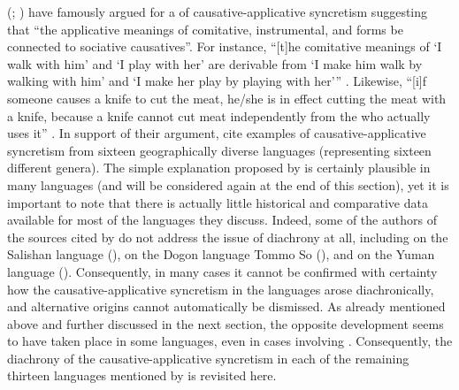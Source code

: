 \citeauthor{shibatani:pardeshi:2001} (\citeyear{shibatani:pardeshi:2001}; \citeyear[118]{shibatani:pardeshi:2002}) have famously argued for a  of causative-applicative syncretism suggesting that “the applicative meanings of comitative, instrumental, and  forms be connected to sociative causatives”. For instance, “[t]he comitative meanings of ‘I walk with him’ and ‘I play with her’ are derivable from ‘I make him walk by walking with him’ and ‘I make her play by playing with her’” \citep[118]{shibatani:pardeshi:2002}. Likewise, “[i]f someone causes a knife to cut the meat, he/she is in effect cutting the meat with a knife, because a knife cannot cut meat independently from the   who actually uses it” \citep[119]{shibatani:pardeshi:2002}. In support of their argument, \citeauthor{shibatani:pardeshi:2002} cite examples of causative-applicative syncretism from sixteen geographically diverse languages (representing sixteen different genera). The simple explanation proposed by \citeauthor{shibatani:pardeshi:2002} is certainly plausible in many languages (and will be considered again at the end of this section), yet it is important to note that there is actually little historical and comparative data available for most of the languages they discuss. Indeed, some of the authors of the sources cited by \citeauthor{shibatani:pardeshi:2002} do not address the issue of diachrony at all, including \cite{saunders:davis:1982} on the Salishan language  (), \cite[392]{plungian:1993} on the Dogon language Tommo So (), and \cite{ichihashi-nakayama:1996} on the Yuman language  (). Consequently, in many cases it cannot be confirmed with certainty how the causative-applicative syncretism in the languages arose diachronically, and alternative origins cannot automatically be dismissed. As already mentioned above and further discussed in the next section, the opposite development seems to have taken place in some languages, even in cases involving . Consequently, the diachrony of the causative-applicative syncretism in each of the remaining thirteen languages mentioned by \cite{shibatani:pardeshi:2002} is revisited here.

